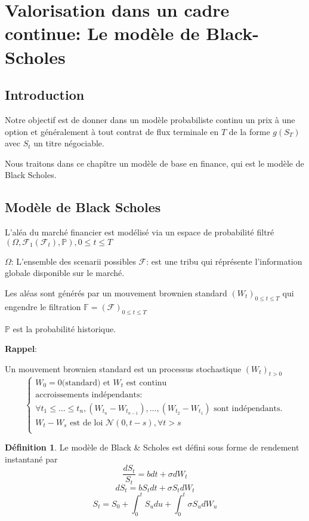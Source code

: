 \documentclass{article}
\theoremstyle{plain}
\theoremstyle{definition}
\newtheorem{defn}[thm]{D\'efinition}
\begin{document}
\section{Valorisation dans un cadre continue: Le mod\`ele de Black-Scholes}
\subsection{Introduction}
Notre objectif est de donner dans un mod\`ele probabiliste continu un prix \`a une option et g\'en\'eralement \`a tout contrat de flux terminale en $T$ de la forme $g(S_T)$ avec $S_t$ un titre n\'egociable.

Nous traitons dans ce chap\^itre un mod\`ele de base en finance, qui est le mod\`ele de Black Scholes.

\subsection{Mod\`ele de Black Scholes}
L'al\'ea du march\'e financier est mod\'elis\'e via un espace de probabilit\'e filtr\'e $(\Omega,\mathcal{F}_1(\mathcal{F}_t),\mathbb{P}),0\leq t\leq T$

$\Omega$: L'ensemble des scenarii possibles
$\mathcal{F}$: est une tribu qui r\'epr\'esente l'information globale disponible sur le march\'e.

Les al\'eas sont g\'en\'er\'es par un mouvement brownien standard $(W_t)_{0\leq t\leq T}$ qui engendre le filtration $\mathbb{F}=(\mathcal{F})_{0\leq t\leq T}$

$\mathbb{P}$ est la probabilit\'e historique.

\textbf{Rappel}:

Un mouvement brownien standard est un processus stochastique $(W_t)_{t>0}$
\begin{equation}
\left\{\begin{array}{l}
W_0=0 \text{(standard) et } W_t \text{ est continu}\\
\text{accroissements ind\'ependants}:\\
\forall t_1\leq\ldots \leq t_n, (W_{t_n}-W_{t_{n-1}}),\ldots,(W_{t_2}-W_{t_1}) \text{ sont ind\'ependants.}\\
W_t-W_s \text{ est de loi } \mathcal{N}(0,t-s),\forall t>s\\
\end{array}\right.
\end{equation}

\begin{defn}
	Le mod\`ele de Black \& Scholes est d\'efini sous forme de rendement instantan\'e par
\begin{equation}
\frac{d S_t}{S_t}=b dt+\sigma d W_t
\end{equation}
\begin{equation}
	d S_t=b S_t dt+\sigma S_t d W_t
\end{equation}
\begin{equation}
S_t=S_0+\int_0^t S_u du +\int_0^t \sigma S_u dW_u
\end{equation}
\end{defn}
\end{document}
